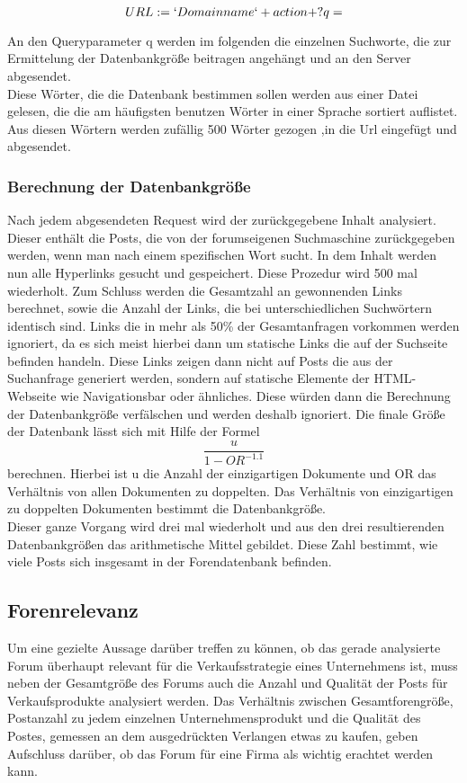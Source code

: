 \[ URL := `Domainname` + action + ?q= \]

An den Queryparameter q werden im folgenden die einzelnen Suchworte, die zur Ermittelung der Datenbankgröße beitragen angehängt und an den Server abgesendet.\\
Diese Wörter, die die Datenbank bestimmen sollen werden aus einer Datei gelesen, die die am häufigsten benutzen Wörter in einer Sprache sortiert auflistet. Aus diesen Wörtern werden zufällig 500 Wörter gezogen ,in die Url eingefügt und abgesendet.\\
\subsubsection{Berechnung der Datenbankgröße}
Nach jedem abgesendeten Request wird der zurückgegebene Inhalt analysiert. Dieser enthält die Posts, die von der 
forumseigenen Suchmaschine zurückgegeben werden, wenn man nach einem spezifischen Wort sucht. In dem Inhalt werden nun alle Hyperlinks gesucht und gespeichert. Diese Prozedur wird 500 mal wiederholt. Zum Schluss werden die Gesamtzahl an gewonnenden Links berechnet, sowie die Anzahl der Links, die bei unterschiedlichen Suchwörtern identisch sind. Links die in mehr als 50\% der Gesamtanfragen vorkommen werden ignoriert, da es sich meist hierbei dann um statische Links die auf der Suchseite befinden handeln. Diese Links zeigen dann nicht auf Posts die aus der Suchanfrage generiert werden, sondern auf statische Elemente der HTML-Webseite wie Navigationsbar oder ähnliches. Diese würden dann die Berechnung der Datenbankgröße verfälschen und werden deshalb ignoriert.
Die finale Größe der Datenbank lässt sich mit Hilfe der Formel \[\frac{u}{1-OR^{-1.1}}\] \cite{lu2008efficient} berechnen. Hierbei ist u die Anzahl der einzigartigen Dokumente und OR das Verhältnis von allen Dokumenten zu doppelten. Das Verhältnis von einzigartigen zu doppelten Dokumenten bestimmt die Datenbankgröße.\\
Dieser ganze Vorgang wird drei mal wiederholt und aus den drei resultierenden Datenbankgrößen das arithmetische Mittel gebildet. Diese Zahl bestimmt, wie viele Posts sich insgesamt in der Forendatenbank befinden.



\subsection{Forenrelevanz}
Um eine gezielte Aussage darüber treffen zu können, ob das gerade analysierte Forum überhaupt relevant für die Verkaufsstrategie eines Unternehmens ist, muss neben der Gesamtgröße des Forums auch die Anzahl und Qualität der Posts für Verkaufsprodukte analysiert werden. Das Verhältnis zwischen Gesamtforengröße, Postanzahl zu jedem einzelnen Unternehmensprodukt und die Qualität des Postes, gemessen an dem ausgedrückten Verlangen etwas zu kaufen, geben Aufschluss darüber, ob das Forum für eine Firma als wichtig erachtet werden kann.
